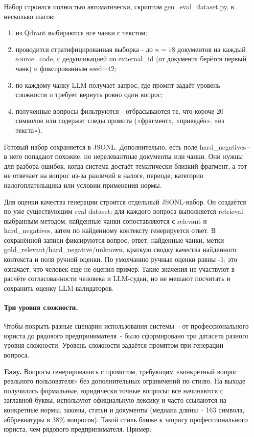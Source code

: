 \documentclass[a4paper,12pt]{article}
\begin{document}
Набор строился полностью автоматически, скриптом gen\_eval\_dataset.py, в несколько шагов:
\begin{enumerate}
  \item из Qdrant выбираются все чанки с текстом;
  \item проводится стратифицированная выборка - до $n=18$ документов на каждый source\_code, с дедупликацией по external\_id (от документа берётся первый чанк) и фиксированным seed=42;
  \item по каждому чанку LLM получает запрос, где промпт задаёт уровень сложности и требует вернуть ровно один вопрос;
  \item полученные вопросы фильтруются - отбрасываются те, что короче 20 символов или содержат следы промпта («фрагмент», «приведён», «из текста»).
\end{enumerate}
Готовый набор сохраняется в JSONL. Дополнительно, есть поле hard\_negatives - в него попадают похожие, но нерелевантные документы или чанки. Они нужны для разбора ошибок, когда система достаёт тематически близкий фрагмент, а тот не отвечает на вопрос из-за различий в налоге, периоде, категории налогоплательщика или условии применения нормы.

Для оценки качества генерации строится отдельный JSONL-набор. Он создаётся по уже существующим eval dataset: для каждого вопроса выполняется retrieval выбранным методом, найденные чанки сопоставляются с relevant и hard\_negatives, затем по найденному контексту генерируется ответ. В сохранённой записи фиксируются вопрос, ответ, найденные чанки, метки gold\_relevant/hard\_negative/unknown, краткую сводку качества найденного контекста и поля ручной оценки. По умолчанию ручные оценки равны -1; это означает, что человек ещё не оценил пример. Такие значения не участвуют в расчёте согласованности человека и LLM-судьи, но не мешают посчитать и сохранить оценку LLM-валидаторов.

\paragraph{Три уровня сложности.}

Чтобы покрыть разные сценарии использования системы~- от профессионального юриста до рядового предпринимателя~- было сформировано три датасета разного уровня сложности. Уровень сложности задаётся промптом при генерации вопроса.

\textbf{Easy.} Вопросы генерировались с промптом, требующим «конкретный вопрос реального пользователя» без дополнительных ограничений по стилю. На выходе получились формальные, юридически точные вопросы: все начинаются с заглавной буквы, используют официальную лексику и часто ссылаются на конкретные нормы, законы, статьи и документы (медиана длины~- 163 символа, аббревиатуры в 38\% вопросов). Такой стиль ближе к запросу профессионального юриста, чем рядового предпринимателя. Пример:
\end{document}
